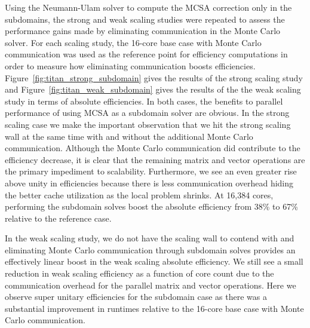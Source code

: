 Using the Neumann-Ulam solver to compute the MCSA correction only in
the subdomains, the strong and weak scaling studies were repeated to
assess the performance gains made by eliminating communication in the
Monte Carlo solver. For each scaling study, the 16-core base case with
Monte Carlo communication was used as the reference point for
efficiency computations in order to measure how eliminating
communication boosts
efficiencies. Figure~\ref{fig:titan_strong_subdomain} gives the
results of the strong scaling study and
Figure~\ref{fig:titan_weak_subdomain} gives the results of the the
weak scaling study in terms of absolute efficiencies. In both cases,
the benefits to parallel performance of using MCSA as a subdomain
solver are obvious. In the strong scaling case we make the important
observation that we hit the strong scaling wall at the same time with
and without the additional Monte Carlo communication. Although the
Monte Carlo communication did contribute to the efficiency decrease,
it is clear that the remaining matrix and vector operations are the
primary impediment to scalability. Furthermore, we see an even greater
rise above unity in efficiencies because there is less communication
overhead hiding the better cache utilization as the local problem
shrinks. At 16,384 cores, performing the subdomain solves boost the
absolute efficiency from 38\% to 67\% relative to the reference case.

In the weak scaling study, we do not have the scaling wall to contend
with and eliminating Monte Carlo communication through subdomain
solves provides an effectively linear boost in the weak scaling
absolute efficiency. We still see a small reduction in weak scaling
efficiency as a function of core count due to the communication
overhead for the parallel matrix and vector operations. Here we
observe super unitary efficiencies for the subdomain case as there was
a substantial improvement in runtimes relative to the 16-core base
case with Monte Carlo communication.

